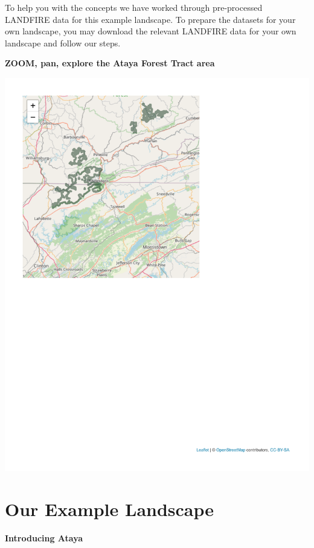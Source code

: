 \documentclass[
]{book}
\begin{document}
To help you with the concepts we have worked through pre-processed LANDFIRE data for this example landscape. To prepare the datasets for your own landscape, you may download the relevant LANDFIRE data for your own landscape and follow our steps.

\textbf{ZOOM, pan, explore the Ataya Forest Tract area}

\includegraphics{FSCBook_files/figure-latex/leafletAtaya-1.pdf}

\hypertarget{Ataya}{%
\chapter{Our Example Landscape}\label{Ataya}}

\textbf{Introducing Ataya}
\end{document}
